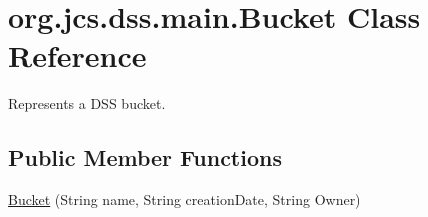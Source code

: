 \hypertarget{classorg_1_1jcs_1_1dss_1_1main_1_1Bucket}{}\section{org.\+jcs.\+dss.\+main.\+Bucket Class Reference}
\label{classorg_1_1jcs_1_1dss_1_1main_1_1Bucket}


Represents a D\+SS bucket.  


\subsection*{Public Member Functions}
\begin{DoxyCompactItemize}
\item 
\hyperlink{classorg_1_1jcs_1_1dss_1_1main_1_1Bucket_aac2a66b1ff751752504aa5cc60f50d97}{Bucket} (String name, String creation\+Date, String Owner)\hypertarget{classorg_1_1jcs_1_1dss_1_1main_1_1Bucket_aac2a66b1ff751752504aa5cc60f50d97}{}\label{classorg_1_1jcs_1_1dss_1_1main_1_1Bucket_aac2a66b1ff751752504aa5cc60f50d97}


\end{DoxyCompactItemize}
